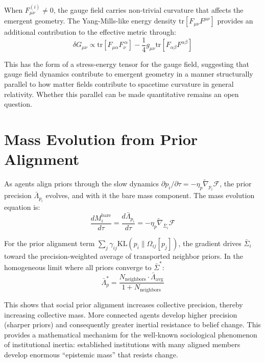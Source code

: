 \documentclass[11pt]{article}
\begin{document}
When $F^{(i)}_{\mu\nu} \neq 0$, the gauge field carries non-trivial curvature that affects the emergent geometry. The Yang-Mills-like energy density $\mathrm{tr}[F_{\mu\nu}F^{\mu\nu}]$ provides an additional contribution to the effective metric through:
\begin{equation}
\delta G_{\mu\nu} \propto \mathrm{tr}[F_{\mu\alpha}F_\nu^{\ \alpha}] - \frac{1}{4}g_{\mu\nu}\mathrm{tr}[F_{\alpha\beta}F^{\alpha\beta}]
\end{equation}

This has the form of a stress-energy tensor for the gauge field, suggesting that gauge field dynamics contribute to emergent geometry in a manner structurally parallel to how matter fields contribute to spacetime curvature in general relativity. Whether this parallel can be made quantitative remains an open question.

\section{Mass Evolution from Prior Alignment}
\label{app:mass_evolution}

As agents align priors through the slow dynamics $\partial p_i/\partial \tau = -\eta_p \tilde{\nabla}_{p_i}\mathcal{F}$, the prior precision $\bar{\Lambda}_{p_i}$ evolves, and with it the bare mass component. The mass evolution equation is:
\begin{equation}
\frac{d M_i^{\text{bare}}}{d\tau} = \frac{d \bar{\Lambda}_{p_i}}{d\tau} = -\eta_p \tilde{\nabla}_{\bar{\Sigma}_i}\mathcal{F}
\end{equation}

For the prior alignment term $\sum_j \gamma_{ij}\mathrm{KL}(p_i \| \Omega_{ij}[p_j])$, the gradient drives $\bar{\Sigma}_i$ toward the precision-weighted average of transported neighbor priors. In the homogeneous limit where all priors converge to $\bar{\Sigma}^*$:
\begin{equation}
\bar{\Lambda}^*_p = \frac{N_{\text{neighbors}} \cdot \bar{\Lambda}_{\text{avg}}}{1 + N_{\text{neighbors}}}
\end{equation}

This shows that social prior alignment increases collective precision, thereby increasing collective mass. More connected agents develop higher precision (sharper priors) and consequently greater inertial resistance to belief change. This provides a mathematical mechanism for the well-known sociological phenomenon of institutional inertia: established institutions with many aligned members develop enormous ``epistemic mass'' that resists change.
\end{document}
